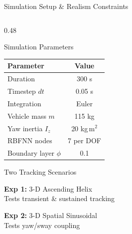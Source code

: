 \documentclass[aspectratio=169,10pt]{beamer}
\begin{document}
\begin{frame}{Simulation Setup \& Realism Constraints}
\begin{columns}[T, onlytextwidth]
\begin{column}{0.48\textwidth}
\begin{block}{Simulation Parameters}
\centering
\scriptsize

\begin{tabular}{lc}
\toprule
Parameter & Value \\
\midrule
Duration & 300 s \\
Timestep $dt$ & 0.05 s \\
Integration & Euler \\
Vehicle mass $m$ & 115 kg \\
Yaw inertia $I_z$ & 20 kg\,m$^2$ \\
RBFNN nodes & 7 per DOF \\
Boundary layer $\phi$ & 0.1 \\
\bottomrule
\end{tabular}

\end{block}

\vspace{3pt}

\begin{exampleblock}{Two Tracking Scenarios}

\textbf{Exp 1:} 3-D Ascending Helix\\
{\scriptsize Tests transient \& sustained tracking}

\vspace{4pt}

\textbf{Exp 2:} 3-D Spatial Sinusoidal\\
{\scriptsize Tests yaw/sway coupling}

\end{exampleblock}

\end{column}

\end{columns}

\end{frame}
\end{document}
